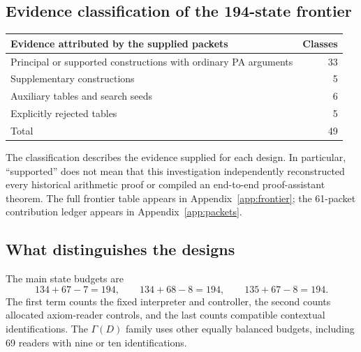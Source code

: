 \documentclass[11pt]{article}
\begin{document}
\subsection{Evidence classification of the 194-state frontier}
\begin{center}
\begin{tabular}{lr}
\toprule
Evidence attributed by the supplied packets & Classes\\
\midrule
Principal or supported constructions with ordinary PA arguments &33\\
Supplementary constructions &5\\
Auxiliary tables and search seeds &6\\
Explicitly rejected tables &5\\
\midrule
Total &49\\
\bottomrule
\end{tabular}
\end{center}
The classification describes the evidence supplied for each design. In particular, ``supported'' does not mean that this investigation independently reconstructed every historical arithmetic proof or compiled an end-to-end proof-assistant theorem. The full frontier table appears in Appendix~\ref{app:frontier}; the 61-packet contribution ledger appears in Appendix~\ref{app:packets}.

\subsection{What distinguishes the designs}
The main state budgets are
\[
 134+67-7=194,\qquad 134+68-8=194,\qquad135+67-8=194.
\]
The first term counts the fixed interpreter and controller, the second counts allocated axiom-reader controls, and the last counts compatible contextual identifications. The $\Gamma(D)$ family uses other equally balanced budgets, including 69 readers with nine or ten identifications.
\end{document}
